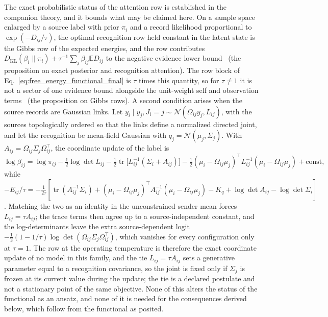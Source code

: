 The exact probabilistic status of the attention row is established in the companion theory, and it bounds what may be claimed here. On a sample space enlarged by a source label with prior $\pi_i$ and a record likelihood proportional to $\exp(-D_{ij}/\tau)$, the optimal recognition row held constant in the latent state is the Gibbs row of the expected energies, and the row contributes $D_{\mathrm{KL}}(\beta_i \| \pi_i) + \tau^{-1}\sum_j \beta_{ij} \mathbb{E} D_{ij}$ to the negative evidence lower bound~\cite[Ch.~6]{DennisGaugeVFE2026} (the proposition on exact posterior and recognition attention). The row block of Eq.~\eqref{eq:free_energy_functional_final} is $\tau$ times this quantity, so for $\tau \neq 1$ it is not a sector of one evidence bound alongside the unit-weight self and observation terms~\cite[Ch.~12]{DennisGaugeVFE2026} (the proposition on Gibbs rows). A second condition arises when the source records are Gaussian links. Let $y_i \mid y_j, J_i = j \sim \mathcal{N}(\Omega_{ij} y_j, L_{ij})$, with the sources topologically ordered so that the links define a normalized directed joint, and let the recognition be mean-field Gaussian with $q_j = \mathcal{N}(\mu_j, \Sigma_j)$. With $A_{ij} = \Omega_{ij}\Sigma_j\Omega_{ij}^\top$, the coordinate update of the label is
\begin{equation}
\log \beta_{ij} = \log \pi_{ij} - \tfrac{1}{2}\log\det L_{ij} - \tfrac{1}{2}\operatorname{tr}\big[L_{ij}^{-1}(\Sigma_i + A_{ij})\big] - \tfrac{1}{2}(\mu_i - \Omega_{ij}\mu_j)^\top L_{ij}^{-1}(\mu_i - \Omega_{ij}\mu_j) + \text{const},
\end{equation}
while $-E_{ij}/\tau = -\frac{1}{2\tau}[\operatorname{tr}(A_{ij}^{-1}\Sigma_i) + (\mu_i - \Omega_{ij}\mu_j)^\top A_{ij}^{-1}(\mu_i - \Omega_{ij}\mu_j) - K_q + \log\det A_{ij} - \log\det\Sigma_i]$. Matching the two as an identity in the unconstrained sender mean forces $L_{ij} = \tau A_{ij}$; the trace terms then agree up to a source-independent constant, and the log-determinants leave the extra source-dependent logit $-\tfrac{1}{2}(1 - 1/\tau)\log\det(\Omega_{ij}\Sigma_j\Omega_{ij}^\top)$, which vanishes for every configuration only at $\tau = 1$. The row at the operating temperature is therefore the exact coordinate update of no model in this family, and the tie $L_{ij} = \tau A_{ij}$ sets a generative parameter equal to a recognition covariance, so the joint is fixed only if $\Sigma_j$ is frozen at its current value during the update; the tie is a declared postulate and not a stationary point of the same objective. None of this alters the status of the functional as an ansatz, and none of it is needed for the consequences derived below, which follow from the functional as posited.

